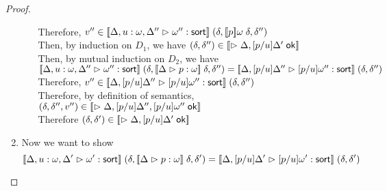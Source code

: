 \begin{proof}
\begin{enumerate}
\begin{itemize}
\begin{tabbedproof}
          \ooooo Therefore, $v'' \in 
                  \interp{\judgeSort[{\Delta, u:\omega, \Delta''}]{\omega''}}\;
                     (\delta, \interp{p}{\omega}\;\delta, \delta'')$ \\
          \ooooo Then, by induction on $D_1$, we have $(\delta, \delta'') \in \interp{\judgeACtx{\Delta, [p/u]\Delta'}}$ \\
          \ooooo Then, by mutual induction on $D_2$, we have \\ 
          \oooox  $\interp{\judgeSort[{\Delta, u:\omega, \Delta''}]{\omega''}} 
                      \;(\delta, \interp{\judgeA{p}{\omega}}\;\delta, \delta'') 
                    = 
                    \interp{\judgeSort[{\Delta, [p/u]\Delta''}]{[p/u]\omega''}}\;(\delta,\delta'')$ \\
          \ooooo Therefore, $v'' \in \interp{\judgeSort[{\Delta, [p/u]\Delta''}]{[p/u]\omega''}}\;(\delta,\delta'')$ \\ 
          \ooooo Therefore, by definition of semantics, 
                   $(\delta, \delta'', v'') \in \interp{\judgeACtx{\Delta, [p/u]\Delta'', [p/u]\omega''}}$ \\
          \ooooo Therefore $(\delta, \delta') \in \interp{\judgeACtx{\Delta, [p/u]\Delta'}}$ \\
        \end{tabbedproof}
      \end{itemize}

  \item Now we want to show 
    \begin{displaymath}
      \interp{\judgeSort[{\Delta, u:\omega, \Delta'}]{\omega'}}\;(\delta, \interp{\judgeA{p}{\omega}}\;\delta, \delta') = \interp{\judgeSort[{\Delta, [p/u]\Delta'}]{[p/u]\omega'}}\;(\delta, \delta')
    \end{displaymath}


\end{enumerate}
\end{proof}
